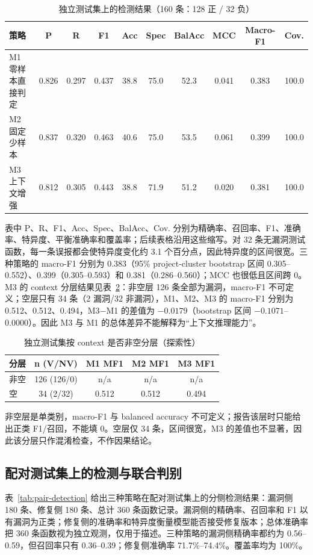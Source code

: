 \documentclass[conference]{IEEEtran}
\begin{document}
\begin{table}[t]
\caption{独立测试集上的检测结果（160 条：128 正 / 32 负）}
\label{tab:ind-results}
\centering
\scriptsize
\begin{tabular}{@{}lccccccccc@{}}
\toprule
策略 & P & R & F1 & Acc & Spec & BalAcc & MCC & Macro-F1 & Cov.\\
\midrule
M1 零样本直接判定 & 0.826 & 0.297 & 0.437 & 38.8 & 75.0 & 52.3 & 0.041 & 0.383 & 100.0\\
M2 固定少样本 & 0.837 & 0.320 & 0.463 & 40.6 & 75.0 & 53.5 & 0.061 & 0.399 & 100.0\\
M3 上下文增强 & 0.812 & 0.305 & 0.443 & 38.8 & 71.9 & 51.2 & 0.020 & 0.381 & 100.0\\
\bottomrule
\end{tabular}
\end{table}

表中 P、R、F1、Acc、Spec、BalAcc、Cov. 分别为精确率、召回率、F1、准确率、特异度、平衡准确率和覆盖率；后续表格沿用这些缩写。对 32 条无漏洞测试函数，每一条误报都会使特异度变化约 3.1 个百分点，因此特异度的区间很宽。三种策略的 macro-F1 分别为 0.383（95\% project-cluster bootstrap 区间 0.305--0.552）、0.399（0.305--0.593）和 0.381（0.286--0.560）；MCC 也很低且区间跨 0。M3 的 context 分层结果见表~\ref{tab:m3-strata}：非空层 126 条全部为漏洞，macro-F1 不可定义；空层只有 34 条（2 漏洞/32 非漏洞），M1、M2、M3 的 macro-F1 分别为 0.512、0.512、0.494，M3−M1 的差值为 $-0.0179$（bootstrap 区间 $-0.1071$--0.0000）。因此 M3 与 M1 的总体差异不能解释为“上下文推理能力”。

\begin{table}[t]
\caption{独立测试集按 context 是否非空分层（探索性）}
\label{tab:m3-strata}
\centering
\scriptsize
\begin{tabular}{@{}lcccc@{}}
\toprule
分层 & n (V/NV) & M1 MF1 & M2 MF1 & M3 MF1\\
\midrule
非空 & 126 (126/0) & n/a & n/a & n/a\\
空 & 34 (2/32) & 0.512 & 0.512 & 0.494\\
\bottomrule
\end{tabular}
\end{table}

非空层是单类别，macro-F1 与 balanced accuracy 不可定义；报告该层时只能给出正类 F1/召回，不能填 0。空层仅 34 条，区间很宽，M3 的差值也不显著，因此该分层只作混淆检查，不作因果结论。

\subsection{配对测试集上的检测与联合判别}
表~\ref{tab:pair-detection} 给出三种策略在配对测试集上的分侧检测结果：漏洞侧 180 条、修复侧 180 条、总计 360 条函数记录。漏洞侧的精确率、召回率和 F1 以有漏洞为正类；修复侧的准确率和特异度衡量模型能否接受修复版本；总体准确率把 360 条函数视为独立观测，仅用于描述。三种策略的漏洞侧精确率都约为 0.56--0.59，但召回率只有 0.36--0.39；修复侧准确率 71.7\%--74.4\%。覆盖率均为 100\%。
\end{document}
